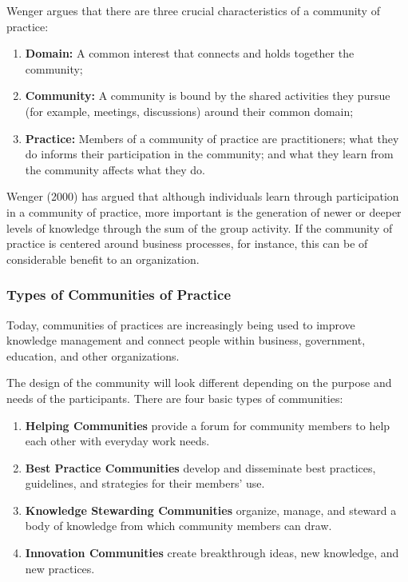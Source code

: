 \documentclass[
]{book}
\providecommand{\tightlist}{%
  \setlength{\itemsep}{0pt}\setlength{\parskip}{0pt}}
\theoremstyle{definition}
\theoremstyle{definition}
\theoremstyle{definition}
\theoremstyle{definition}
\theoremstyle{remark}
\begin{document}
Wenger argues that there are three crucial characteristics of a community of practice:

\begin{enumerate}
\def\labelenumi{\arabic{enumi}.}
\tightlist
\item
  \textbf{Domain:} A common interest that connects and holds together the community;\\
\item
  \textbf{Community:} A community is bound by the shared activities they pursue (for example, meetings, discussions) around their common domain;\\
\item
  \textbf{Practice:} Members of a community of practice are practitioners; what they do informs their participation in the community; and what they learn from the community affects what they do.
\end{enumerate}

Wenger (2000) has argued that although individuals learn through participation in a community of practice, more important is the generation of newer or deeper levels of knowledge through the sum of the group activity. If the community of practice is centered around business processes, for instance, this can be of considerable benefit to an organization.

\hypertarget{types-of-communities-of-practice}{%
\subsubsection*{Types of Communities of Practice}\label{types-of-communities-of-practice}}

Today, communities of practices are increasingly being used to improve knowledge management and connect people within business, government, education, and other organizations.

The design of the community will look different depending on the purpose and needs of the participants. There are four basic types of communities:

\begin{enumerate}
\def\labelenumi{\arabic{enumi}.}
\tightlist
\item
  \textbf{Helping Communities} provide a forum for community members to help each other with everyday work needs.\\
\item
  \textbf{Best Practice Communities} develop and disseminate best practices, guidelines, and strategies for their members' use.\\
\item
  \textbf{Knowledge Stewarding Communities} organize, manage, and steward a body of knowledge from which community members can draw.\\
\item
  \textbf{Innovation Communities} create breakthrough ideas, new knowledge, and new practices.
\end{enumerate}
\end{document}

